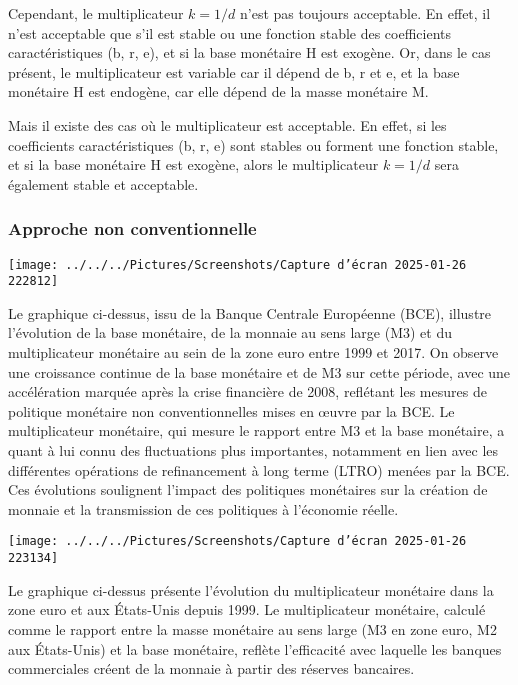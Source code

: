 \documentclass[a4paper, 12pt]{report}
\begin{document}
Cependant, le multiplicateur $k = 1/d$ n'est pas toujours acceptable. En effet, il n'est acceptable que s'il est stable ou une fonction stable des coefficients caractéristiques (b, r, e), et si la base monétaire H est exogène. Or, dans le cas présent, le multiplicateur est variable car il dépend de b, r et e, et la base monétaire H est endogène, car elle dépend de la masse monétaire M.

Mais il existe des cas où le multiplicateur est acceptable. En effet, si les coefficients caractéristiques (b, r, e) sont stables ou forment une fonction stable, et si la base monétaire H est exogène, alors le multiplicateur $k = 1/d$ sera également stable et acceptable.

\subsubsection{Approche non conventionnelle}

\begin{center}
	\texttt{[image: ../../../Pictures/Screenshots/Capture d'écran 2025-01-26 222812]}
\end{center}


Le graphique ci-dessus, issu de la Banque Centrale Européenne (BCE), illustre l'évolution de la base monétaire, de la monnaie au sens large (M3) et du multiplicateur monétaire au sein de la zone euro entre 1999 et 2017. On observe une croissance continue de la base monétaire et de M3 sur cette période, avec une accélération marquée après la crise financière de 2008, reflétant les mesures de politique monétaire non conventionnelles mises en œuvre par la BCE. Le multiplicateur monétaire, qui mesure le rapport entre M3 et la base monétaire, a quant à lui connu des fluctuations plus importantes, notamment en lien avec les différentes opérations de refinancement à long terme (LTRO) menées par la BCE. Ces évolutions soulignent l'impact des politiques monétaires sur la création de monnaie et la transmission de ces politiques à l'économie réelle.
	
\begin{center}
	\texttt{[image: ../../../Pictures/Screenshots/Capture d'écran 2025-01-26 223134]}
\end{center}
	
Le graphique ci-dessus présente l'évolution du multiplicateur monétaire dans la zone euro et aux États-Unis depuis 1999. Le multiplicateur monétaire, calculé comme le rapport entre la masse monétaire au sens large (M3 en zone euro, M2 aux États-Unis) et la base monétaire, reflète l'efficacité avec laquelle les banques commerciales créent de la monnaie à partir des réserves bancaires.
\end{document}
